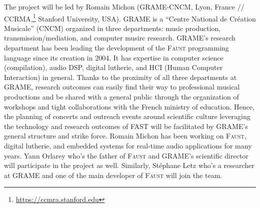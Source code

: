 \documentclass[a4paper,10pt]{article}
\newcommand{\F}{\textsc{Faust}}
\newcommand{\PP}{FAST}
\begin{document}
The project will be led by Romain Michon (GRAME-CNCM, Lyon, France // CCRMA,\footnote{\url{https://ccmra.stanford.edu}} Stanford University, USA). GRAME is a ``Centre National de Création Musicale'' (CNCM) organized in three departments: music production, transmission/mediation, and computer musirc research. GRAME's research department has been leading the development of the \F{} programming language since its creation in 2004. It has expertise in computer science (compilation), audio DSP, digital lutherie, and HCI (Human Computer Interaction) in general. Thanks to the proximity of all three departments at GRAME, research outcomes can easily find their way to professional musical productions and be shared with a general public through the organization of workshops and tight collaborations with the French ministry of education. Hence, the planning of concerts and outreach events around scientific culture leveraging the technology and research outcomes of \PP{} will be facilitated by GRAME's general structure and strike force. Romain Michon has been working on \F{}, digital lutherie, and embedded systems for real-time audio applications for many years. Yann Orlarey who's the father of \F{} and GRAME's scientific director will participate in the project as well. Similarly, Stéphane Letz who's a researcher at GRAME and one of the main developer of \F{} will join the team. 
\end{document}
